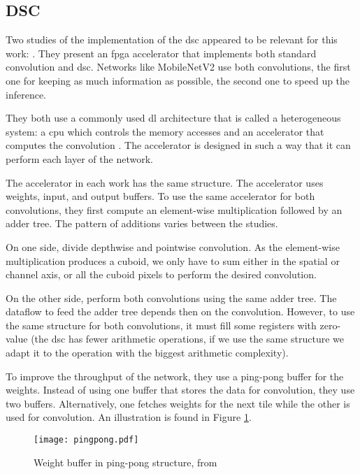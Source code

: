 \subsection{DSC} \label{subsec:impl_dsc}
%
%
Two studies of the implementation of the \acrshort{dsc} appeared to be relevant for this work: \textcite{bai_cnn_2018, liu_fpga-based_2019}. They present an \acrshort{fpga} accelerator that implements both standard convolution and \acrshort{dsc}. Networks like MobileNetV2 use both convolutions, the first one for keeping as much information as possible, the second one to speed up the inference. 

They both use a commonly used \acrshort{dl} architecture that is called a heterogeneous system: a \acrshort{cpu} which controls the memory accesses and an accelerator that computes the convolution \cite{liu_fpga-based_2019}. The accelerator is designed in such a way that it can perform each layer of the network.

The accelerator in each work has the same structure. The accelerator uses weights, input, and output buffers. To use the same accelerator for both convolutions, they first compute an element-wise multiplication followed by an adder tree. The pattern of additions varies between the studies. 

On one side, \textcite{bai_cnn_2018} divide depthwise and pointwise convolution. As the element-wise multiplication produces a cuboid, we only have to sum either in the spatial or channel axis, or all the cuboid pixels to perform the desired convolution. 

On the other side, \textcite{liu_fpga-based_2019} perform both convolutions using the same adder tree. The dataflow to feed the adder tree depends then on the convolution. However, to use the same structure for both convolutions, it must fill some registers with zero-value (the \acrshort{dsc} has fewer arithmetic operations, if we use the same structure we adapt it to the operation with the biggest arithmetic complexity).

To improve the throughput of the network, they use a ping-pong buffer for the weights. Instead of using one buffer that stores the data for convolution, they use two buffers. Alternatively, one fetches weights for the next tile while the other is used for convolution. An illustration is found in Figure \ref{fig:ping_pong_buffer}.
%
\begin{figure}[H]
	\centering
	\texttt{[image: pingpong.pdf]}
	\caption{Weight buffer in ping-pong structure, from \cite{bai_cnn_2018}}
	\label{fig:ping_pong_buffer}
\end{figure}

